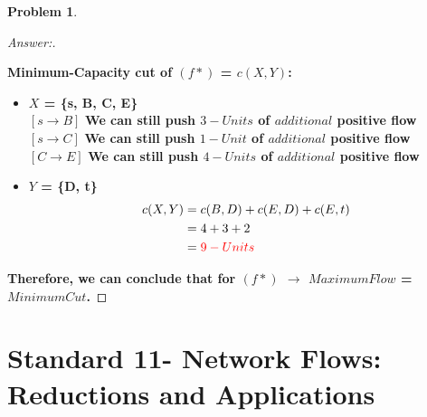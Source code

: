 \documentclass[11pt]{article}
\theoremstyle{definition}
\theoremstyle{definition}
\newtheorem{required}{Problem}
\theoremstyle{definition}
\begin{document}
\begin{required}
\begin{enumerate}[label=(\alph*)]
\begin{proof}[Answer:]
\begin{center}
\end{center}
\item \textbf{Minimum-Capacity cut of $(f*)$ = $c(X, Y)$:}
\begin{itemize}
\item \textbf{$X$ = \{s, B, C, E\}} \\
\hspace*{2mm} $[s \to B]$ \textbf{We can still push $3-Units$ of $additional$ positive flow} \\
\hspace*{2mm} $[s \to C]$ \textbf{We can still push $1-Unit$ of $additional$ positive flow} \\
\hspace*{2mm} $[C \to E]$ \textbf{We can still push $4-Units$ of $additional$ positive flow} \\
\item \textbf{$Y$ = \{D, t\}} \\
\begin{align*}
c(X, Y) &= c(B, D) + c(E, D) + c(E, t) \\
&= 4 + 3 + 2 \\
&= \color{red}9-Units
\end{align*}
\hspace*{2mm} 
\end{itemize}
\item \textbf{Therefore, we can conclude that for \color{red}$(f*)$ $\to$ $Maximum Flow$ = $Minimum Cut$\color{black}.}
\end{proof}

\end{enumerate}
\end{required}



\newpage
\section{Standard 11- Network Flows: Reductions and Applications}
\end{document}
